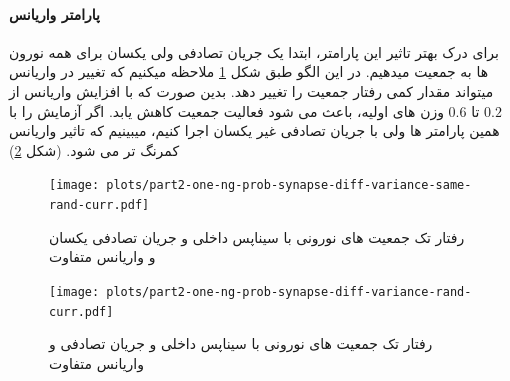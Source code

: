             
            \paragraph*{پارامتر واریانس}
                برای درک بهتر تاثیر این پارامتر، ابتدا یک جریان تصادفی ولی یکسان برای همه نورون ها به جمعیت میدهیم.
                در این الگو طبق شکل 
                \ref{fig:part2-one-ng-prob-synapse-diff-variance-same-rand-curr}
                ملاحظه میکنیم که تغییر در واریانس میتواند مقدار کمی رفتار جمعیت را تغییر دهد. بدین صورت که با افزایش واریانس از 
                $0.2$ 
                تا
                $0.6$ 
                وزن های اولیه، باعث می شود فعالیت جمعیت کاهش یابد. اگر آزمایش را با همین پارامتر ها ولی با جریان تصادفی غیر یکسان اجرا کنیم، میبینیم که تاثیر واریانس کمرنگ تر می شود.
                (شکل \ref{fig:part2-one-ng-prob-synapse-diff-variance-rand-curr})
                \begin{figure}[!ht]
                    \centering
                    \texttt{[image: plots/part2-one-ng-prob-synapse-diff-variance-same-rand-curr.pdf]} 
                    \caption{رفتار تک جمعیت های نورونی با سیناپس داخلی و جریان تصادفی یکسان و واریانس متفاوت}
                    \label{fig:part2-one-ng-prob-synapse-diff-variance-same-rand-curr}
                \end{figure}
                \begin{figure}[!ht]
                    \centering
                    \texttt{[image: plots/part2-one-ng-prob-synapse-diff-variance-rand-curr.pdf]} 
                    \caption{رفتار تک جمعیت های نورونی با سیناپس داخلی و جریان تصادفی و واریانس متفاوت}
                    \label{fig:part2-one-ng-prob-synapse-diff-variance-rand-curr}
                \end{figure}
            
